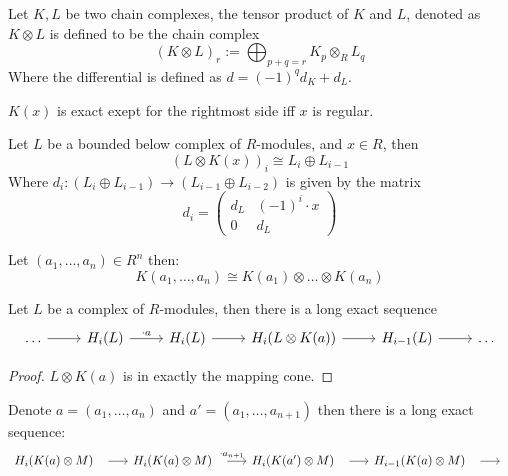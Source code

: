 \begin{definition}
\begin{definition}
	\label{def:complex_tensor_product}
	Let $K, L$ be two chain complexes, the tensor product of $K$ and $L$, denoted as $K \otimes L$ is defined to be the chain complex
	$$(K \otimes L)_r := \bigoplus_{p + q = r}K_p \otimes_R L_q$$
	Where the differential is defined as $d = (-1)^q d_K + d_L$.
\end{definition}

\begin{lemma}
	\label{lem:koszul_of_length_2}
	$K(x)$ is exact exept for the rightmost side iff $x$ is regular.
\end{lemma}

\begin{lemma}
	\label{lem:koszul_tensor_as_mapping_cone}
	Let $L$ be a bounded below complex of $R$-modules, and $x \in R$, then
	$$(L \otimes K(x))_i \cong L_i \oplus L_{i-1}$$
	Where $d_i: (L_i \oplus L_{i-1}) \to (L_{i-1}\oplus L_{i-2})$ is given by the matrix
	$$d_i = \begin{pmatrix}d_L & (-1)^i \cdot x \\ 0 & d_L\end{pmatrix}$$
\end{lemma}

\begin{theorem}
	\label{thm:long_koszul_build_by_tensoring}
	Let $(a_1, \dots, a_n) \in R^n$ then:
	$$K(a_1, \dots, a_n) \cong K(a_1) \otimes \dots \otimes K(a_n)$$
\end{theorem}

\begin{lemma}
	\label{lem:koszul_induces_long_exact_seq}
	Let $L$ be a complex of $R$-modules, then there is a long exact sequence
\[\begin{tikzcd}
	\dots & {H_i(L)} & {H_i(L)} & {H_i(L\otimes K(a))} & {H_{i-1}(L)} & \dots
	\arrow[from=1-1, to=1-2]
	\arrow["{\cdot a}", from=1-2, to=1-3]
	\arrow[from=1-3, to=1-4]
	\arrow[from=1-4, to=1-5]
	\arrow[from=1-5, to=1-6]
\end{tikzcd}\]

\begin{proof}
	$L \otimes K(a)$ is in exactly the mapping cone.
\end{proof}

\end{lemma}


\begin{corollary}
	\label{cor:tensor_koszul_induced_long_exact_seq}
	Denote $a = (a_1, \dots, a_n)$ and $a' = (a_1, \dots, a_{n+1})$ then there is a long exact sequence:
\[\begin{tikzcd}
	{H_i(K(a) \otimes M)} & {H_i(K(a) \otimes M)} & {H_i(K(a') \otimes M)} & {H_{i-1}(K(a) \otimes M)} & 
	\arrow[shorten <=8pt, from=1-1, to=1-2]
	\arrow[shorten <=8pt, "{\cdot a_{n+1}}", from=1-2, to=1-3]
	\arrow[shorten <=8pt, from=1-3, to=1-4]
	\arrow[shorten <=8pt, from=1-4, to=1-5]
\end{tikzcd}\]
\end{corollary}


\end{definition}
